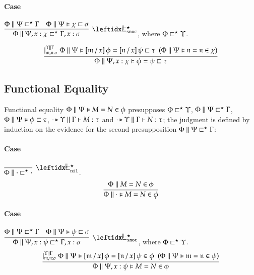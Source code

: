 \documentclass[11pt]{article}
\theoremstyle{definition}
\theoremstyle{remark}
\numberwithin{equation}{section}
\def\IModeColorName{MidnightBlue}
\def\OModeColorName{Maroon}
\def\IModeColorName{Black}
\def\OModeColorName{Black}
\newcommand\IMode[1]{{\color{\IModeColorName}{#1}}}
\newcommand\OMode[1]{{\color{\OModeColorName}{#1}}}
\newcommand\HypJ[2]{#1\ \ (#2)}
\newcommand\HPGenJ[4]{\vert^{\IMode{#1}\parallel\IMode{#2}}_{\IMode{#3}}\; #4}
\newcommand\IsAbtUnmoded[5]{
  #1\triangleright%
  #2\parallel%
  #3\vdash%
  #4:\OMode{#5}%
}
\newcommand\IsAbt[5]{\IsAbtUnmoded{\IMode{#1}}{\IMode{#2}}{\IMode{#3}}{\IMode{#4}}{\OMode{#5}}}
\newcommand\MV[1]{\mathfrak{#1}}
\newcommand\Subst[3]{%
  \left[#1\, /\, #2\right]#3%
}
\newcommand\RefinesCtx[2]{\IMode{#1}\sqsubset^\star\OMode{#2}}
\newcommand\HRefines[4]{\IMode{#1}\parallel\IMode{#2}\vDash\IMode{#3}\sqsubset\OMode{#4}}
\newcommand\HEqRefines[5]{\IMode{#1}\parallel\IMode{#2}\vDash\IMode{#3}=\IMode{#4}\sqsubset\OMode{#5}}
\newcommand\PRefinesCtx[3]{\IMode{#1}\parallel\IMode{#2}\sqsubset^\star\OMode{#3}}
\newcommand\RMemEq[4]{\IMode{#1}\parallel\IMode{#2}=\IMode{#3}\in\IMode{#4}}
\newcommand\HRMemEq[5]{\IMode{#1}\parallel\IMode{#2}\vDash\IMode{#3}=\IMode{#4}\in\IMode{#5}}
\begin{document}
\paragraph{Case} $\DefPRefinesCtxSnoc{\Phi}{\Psi}{x}{\chi}{\Gamma}{\sigma}$,
where $\RefinesCtx{\Phi}{\Upsilon}$.

\begin{gather*}
  \infer{
    \HEqRefines{\Phi}{\Psi,x:\chi}{\phi}{\psi}{\tau}
  }{
    \HPGenJ{\Upsilon}{\Gamma}{\MV{m},\MV{n}:\sigma}{
      \HypJ{
        \HEqRefines{\Phi}{\Psi}{
          \Subst{\MV{m}}{x}{\phi}
        }{
          \Subst{\MV{n}}{x}{\psi}
        }{\tau}
      }{
        \HRMemEq{\Phi}{\Psi}{\MV{n}}{\MV{n}}{\chi}
      }
    }
  }
\end{gather*}

\subsection{Functional Equality}

Functional equality $\HRMemEq{\Phi}{\Psi}{M}{N}{\phi}$ presupposes
$\RefinesCtx{\Phi}{\Upsilon}$, $\PRefinesCtx{\Phi}{\Psi}{\Gamma}$,
$\HRefines{\Phi}{\Psi}{\phi}{\tau}$, $\IsAbt{\cdot}{\Upsilon}{\Gamma}{M}{\tau}$
and $\IsAbt{\cdot}{\Upsilon}{\Gamma}{N}{\tau}$; the judgment is defined by
induction on the evidence for the second presupposition
$\PRefinesCtx{\Phi}{\Psi}{\Gamma}$:

\paragraph{Case} $\DefPRefinesCtxNil{\Phi}$.
\[
  \infer{
    \HRMemEq{\Phi}{\cdot}{M}{N}{\phi}
  }{
    \RMemEq{\Phi}{M}{N}{\phi}
  }
\]

\paragraph{Case} $\DefPRefinesCtxSnoc{\Phi}{\Psi}{x}{\psi}{\Gamma}{\sigma}$,
where $\RefinesCtx{\Phi}{\Upsilon}$.
\[
  \infer{
    \HRMemEq{\Phi}{\Psi,x:\psi}{M}{N}{\phi}
  }{
    \HPGenJ{\Upsilon}{\Gamma}{\MV{m},\MV{n}:\sigma}{
      \HypJ{
        \HRMemEq{\Phi}{\Psi}{
          \Subst{\MV{m}}{x}{\phi}
        }{
          \Subst{\MV{n}}{x}{\psi}
        }{\phi}
      }{
        \HRMemEq{\Phi}{\Psi}{\MV{m}}{\MV{n}}{\psi}
      }
    }
  }
\]

\ifdraft{}{
  \nocite{maclane:1971}
  
  
}
\end{document}
